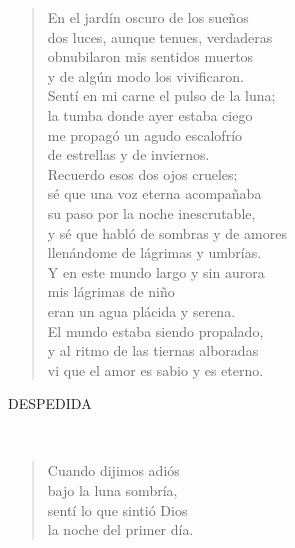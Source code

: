 \documentclass[a4paper, 12pt]{article}
\begin{document}
\begin{verse}
En el jardín oscuro de los sueños\\
dos luces, aunque tenues, verdaderas\\
obnubilaron mis sentidos muertos\\
y de algún modo los vivificaron.\\
Sentí en mi carne el pulso de la luna;\\
la tumba donde ayer estaba ciego\\
me propagó un agudo escalofrío\\
de estrellas y de inviernos.\\
Recuerdo esos dos ojos crueles;\\
sé que una voz eterna acompañaba\\
su paso por la noche inescrutable,\\
y sé que habló de sombras y de amores\\
llenándome de lágrimas y umbrías.\\
Y en este mundo largo y sin aurora\\
mis lágrimas de niño\\
eran un agua plácida y serena.\\
El mundo estaba siendo propalado,\\
y al ritmo de las tiernas alboradas\\
vi que el amor es sabio y es eterno.\\
\end{verse}

\pagebreak

\centerline{DESPEDIDA}
~ 

\begin{verse}
    
Cuando dijimos adiós\\
bajo la luna sombría,\\
sentí lo que sintió Dios\\
la noche del primer día.\\
\end{verse}

\pagebreak
\end{document}

